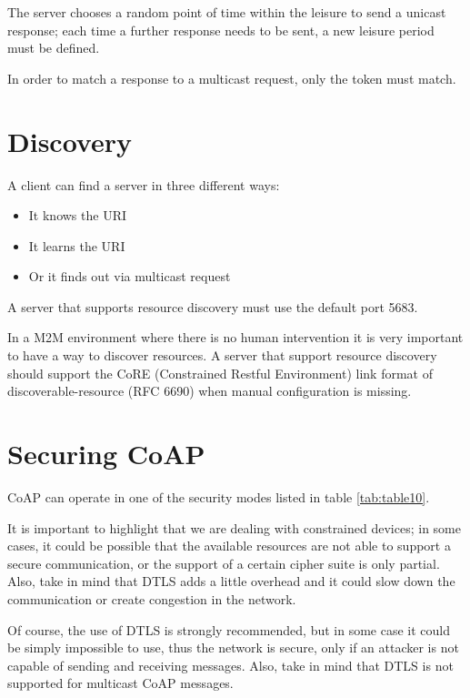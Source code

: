 	The server chooses a random point of time within the leisure to send a unicast response; 
	each time a further response needs to be sent, a new leisure period must be defined.\newline
	
	In order to match a response to a multicast request, only the token must match.\newline
	
	\section{Discovery}
	A client can find a server in three different ways:
	\begin{itemize}
		\item It knows the URI
		\item It learns the URI
		\item Or it finds out via multicast request
	\end{itemize}

	A server that supports resource discovery must use the default port 5683.\newline
	
	In a M2M environment where there is no human intervention it is very important to have a way to discover resources.\newline
	A server that support resource discovery should support the CoRE (Constrained Restful Environment) link format of discoverable-resource (RFC 6690) when manual configuration is missing.\newline
	
	\section{Securing CoAP}
	CoAP can operate in one of the security modes listed in table \ref{tab:table10}.
	
	
	
	It is important to highlight that we are dealing with constrained devices; in some cases, it could be possible that the available resources are not able to support a secure communication, or the support of a certain cipher suite is only partial.\newline
	Also, take in mind that DTLS adds a little overhead and it could slow down the communication or create congestion in the network.\newline
	
	Of course, the use of DTLS is strongly recommended, but in some case it could be simply impossible to use, thus the network is secure, only if an attacker is not capable of sending and receiving messages.\newline
	Also, take in mind that DTLS is not supported for multicast CoAP messages.\newline
	
